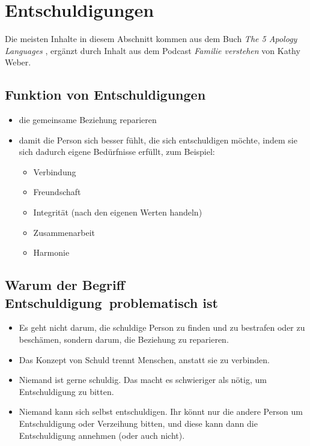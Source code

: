 \section{Entschuldigungen}
\label{entschuldigungen}

Die meisten Inhalte in diesem Abschnitt kommen aus dem Buch \emph{The 5 Apology Languages} \cite{apology-languages}, ergänzt durch Inhalt aus dem Podcast \emph{Familie verstehen} \cite{familie-verstehen-podcast} von Kathy Weber.


\subsection{Funktion von Entschuldigungen}

\begin{itemize}
  \item die gemeinsame Beziehung reparieren
  \item damit die Person sich besser fühlt, die sich entschuldigen möchte, indem sie sich dadurch eigene Bedürfnisse erfüllt, zum Beispiel:
    \begin{itemize}
      \item Verbindung
      \item Freundschaft
      \item Integrität (nach den eigenen Werten handeln)
      \item Zusammenarbeit
      \item Harmonie
    \end{itemize}
\end{itemize}


\subsection{Warum der Begriff \glqq Entschuldigung\grqq\ problematisch ist}

\begin{itemize}
  \item Es geht nicht darum, die schuldige Person zu finden und zu bestrafen oder zu beschämen, sondern darum, die Beziehung zu reparieren.
  \item Das Konzept von Schuld trennt Menschen, anstatt sie zu verbinden.
  \item Niemand ist gerne schuldig. Das macht es schwieriger als nötig, um Entschuldigung zu bitten.
  \item Niemand kann sich selbst entschuldigen. Ihr könnt nur die andere Person um Entschuldigung oder Verzeihung bitten, und diese kann dann die Entschuldigung annehmen (oder auch nicht).
\end{itemize}


